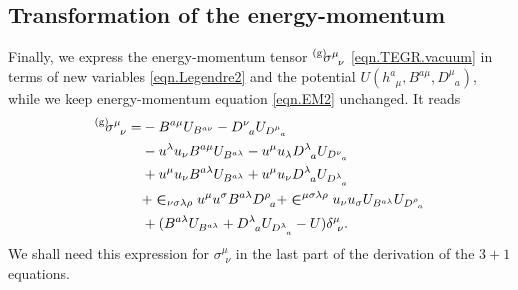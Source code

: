 \documentclass[
10pt, %
a4paper, %
oneside, %
headinclude,footinclude, %
BCOR5mm, %
]{scrartcl}
\newcommand{\tetrsymbol}{h}
\newcommand{\tetr}[2]{\tetrsymbol^{#1}_{\phantom{#1}#2}}
\newcommand{\Dm}[2]{D_{\phantom{#2}#1}^{#2}}	%
\newcommand{\Bm}[2]{B^{#1#2}}	%
\newcommand{\Um}{U}%
\newcommand{\EM}[2]{\Sigma^{#1}_{\phantom{#1}#2}}
\newcommand{\EMmat}[2]{\sigma^{#1}_{\ \,#2}}
\newcommand{\LCsymb}{\bm{\in}}    %
\newcommand{\gra}[1]{\prescript{\text{(g)}}{}{\hspace{-0.1cm}#1}}
\newcommand{\KD}[2]{\delta^{#1}_{\ #2}}
\begin{document}
\subsection{Transformation of the energy-momentum}
Finally, we express the energy-momentum tensor $ \gra{\EMmat{\mu}{\nu}} $ \eqref{eqn.TEGR.vacuum} 
in 
terms of 
new 
variables 
\eqref{eqn.Legendre2} and 
the potential $ \Um(\tetr{a}{\mu},\Bm{a}{\mu},\Dm{a}{\mu}) $, while we keep energy-momentum 
equation \eqref{eqn.EM2} unchanged. It reads
\begin{align}\label{eqn.sigma.BD}
	\gra{\EMmat{\mu}{\nu}} =
	& -\Bm{a}{\mu}\Um_{\Bm{a}{\nu}} - \Dm{a}{\nu}\Um_{\Dm{a}{\mu}} \\
	& - u^\lambda u_\nu \Bm{a}{\mu} \Um_{\Bm{a}{\lambda}} 
	  - u^\mu u_\lambda \Dm{a}{\lambda} \Um_{\Dm{a}{\nu}}
	  \nonumber\\
	& + u^\mu u_\nu \Bm{a}{\lambda} \Um_{\Bm{a}{\lambda}} 
	  + u^\mu u_\nu \Dm{a}{\lambda} \Um_{\Dm{a}{\lambda}}
	\nonumber \\
	& + \LCsymb_{\nu\sigma\lambda\rho} u^\mu u^\sigma \Bm{a}{\lambda} \Dm{a}{\rho} 
	  + \LCsymb^{\mu\sigma\lambda\rho} u_\nu u_\sigma \Um_{\Bm{a}{\lambda}} 
	\Um_{\Dm{a}{\rho}} 
	\nonumber \\
	& + (\Bm{a}{\lambda} \Um_{\Bm{a}{\lambda}} + \Dm{a}{\lambda} \Um_{\Dm{a}{\lambda}} - 
	\Um) \KD{\mu}{\nu}. \nonumber
\end{align}
We shall need this expression for $ \EMmat{\mu}{\nu} $ in the last part of the derivation of the $ 
3+1 $ equations.

\end{document}
